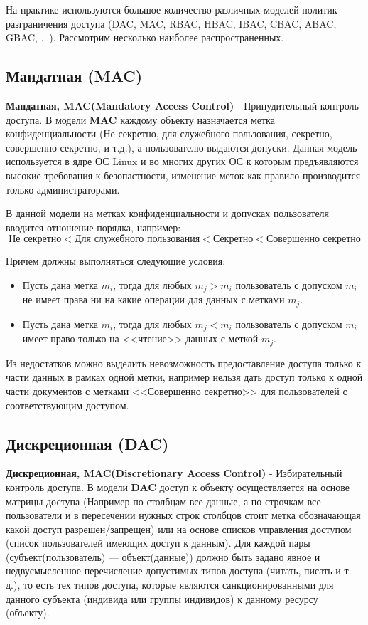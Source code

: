На практике используются большое количество различных моделей политик разграничения доступа (DAC, MAC, RBAC, HBAC, IBAC, CBAC, ABAC, GBAC, ...). Рассмотрим несколько наиболее распространенных.

\subsection{Мандатная (MAC)}

\textbf{Мандатная, MAC(Mandatory Access Control)} - Принудительный контроль доступа. В модели \textbf{MAC} каждому объекту назначается метка конфиденциальности (Не секретно, для служебного пользования, секретно, совершенно секретно, и т.д.), а пользователю выдаются допуски. Данная модель используется в ядре ОС Linux и во многих других ОС к которым предъявляются высокие требования к безопастности, изменение меток как правило производится только администраторами. 

В данной модели на метках конфиденциальности и допусках пользователя вводится отношение порядка, например: $$\text{Не секретно} < \text {Для служебного пользования} < \text{Секретно} < \text {Совершенно секретно}$$

Причем должны выполняться следующие условия:
\begin{itemize}
	\item Пусть дана метка $m_i$, тогда для любых $m_j > m_i$ пользователь с допуском $m_i$ не имеет права ни на какие операции для данных с метками $m_j$.
	\item Пусть дана метка $m_i$, тогда для любых $m_j < m_i$ пользователь с допуском $m_i$ имеет право только на <<чтение>> данных с меткой $m_j$.
\end{itemize}

Из недостатков можно выделить невозможность предоставление доступа только к части данных в рамках одной метки, например нельзя дать доступ только к одной части документов с метками <<Совершенно секретно>> для пользователей с соответствующим доступом.

\subsection{Дискреционная (DAC)}
\textbf{Дискреционная, MAC(Discretionary Access Control)} - Избирательный контроль доступа. В модели \textbf{DAC} доступ к объекту осуществляется на основе матрицы доступа (Например по столбцам все данные, а по строчкам все пользователи и в пересечении нужных строк столбцов стоит метка обозначающая какой доступ разрешен/запрещен) или на основе списков управления доступом (список пользователей имеющих доступ к данным). Для каждой пары (субъект(пользователь) — объект(данные)) должно быть задано явное и недвусмысленное перечисление допустимых типов доступа (читать, писать и т. д.), то есть тех типов доступа, которые являются санкционированными для данного субъекта (индивида или группы индивидов) к данному ресурсу (объекту).

